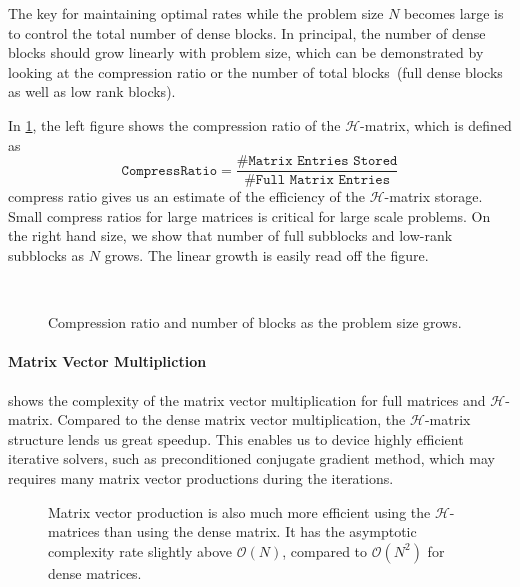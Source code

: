 \documentclass[3p,,preprint,12pt]{elsarticle}
\theoremstyle{definition}
\begin{document}
The key for maintaining optimal rates while the problem size $N$ becomes large is to control the total number of dense blocks. In principal, the number of dense blocks should grow linearly with problem size, which can be demonstrated by looking at the compression ratio or the number of total blocks~(full dense blocks as well as low rank blocks). 


In \cref{fig:compress}, the left figure shows the compression ratio of the $\mathcal{H}$-matrix, which is defined as
\begin{equation}
\texttt{CompressRatio}=\frac{\#\texttt{Matrix Entries Stored}}{\#\texttt{Full Matrix Entries}}
\end{equation}
compress ratio gives us an estimate of the efficiency of the $\mathcal{H}$-matrix storage. Small compress ratios for large matrices is critical for large scale problems. On the right hand size, we show that number of full subblocks and low-rank subblocks as $N$ grows. The linear growth is easily read off the figure. 

\begin{figure}[htpb]
\centering
\scalebox{0.4}{}~
\scalebox{0.4}{}~
\caption{Compression ratio and number of blocks as the problem size grows.}
\label{fig:compress}
\end{figure}



\paragraph{Matrix Vector Multipliction}

 shows the complexity of the matrix vector multiplication for full matrices and $\mathcal{H}$-matrix. Compared to the dense matrix vector multiplication, the $\mathcal{H}$-matrix structure lends us great speedup. This enables us to device highly efficient iterative solvers, such as preconditioned conjugate gradient method, which may requires many matrix vector productions during the iterations.  

\begin{figure}[htpb]
\centering
\scalebox{0.6}{}
\caption{Matrix vector production is also much more efficient using the $\mathcal{H}$-matrices than using the dense matrix. It has the asymptotic complexity rate slightly above $\mathcal{O}(N)$, compared to $\mathcal{O}(N^2)$ for dense matrices.}
\label{fig:matvec}
\end{figure}
\end{document}
